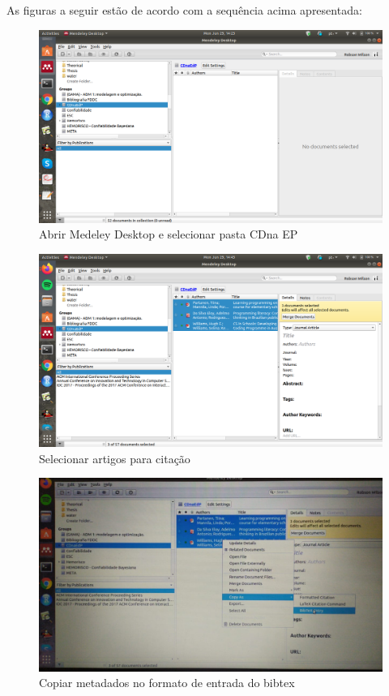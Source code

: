 \documentclass[
]{book}
\begin{document}
As figuras a seguir estão de acordo com a sequência acima apresentada:

\begin{figure}
\centering
\includegraphics{fig/open_mendeley.png}
\caption{Abrir Medeley Desktop e selecionar pasta CDna EP}
\end{figure}

\begin{figure}
\centering
\includegraphics{fig/mendeley_select_CDnaEP_paper_list.png}
\caption{Selecionar artigos para citação}
\end{figure}

\begin{figure}
\centering
\includegraphics{fig/mendeley_copy_bibtex_entry.jpeg}
\caption{Copiar metadados no formato de entrada do bibtex}
\end{figure}
\end{document}
